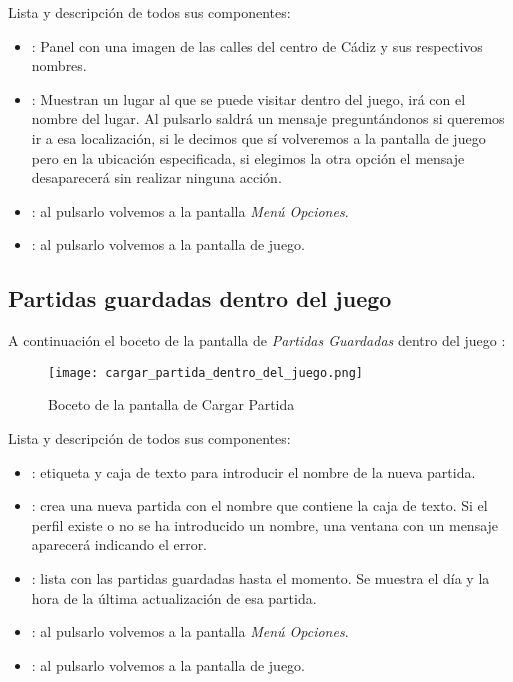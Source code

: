             Lista y descripción de todos sus componentes:
            \begin{itemize}
            \item {}: Panel con una imagen de las calles del centro de Cádiz y sus respectivos nombres.
            \item {}: Muestran un lugar al que se puede visitar dentro del juego, irá con el nombre del lugar. Al pulsarlo saldrá un mensaje preguntándonos si queremos ir a esa localización, si le decimos que sí volveremos a la pantalla de juego pero en la ubicación especificada, si elegimos la otra opción el mensaje desaparecerá sin realizar ninguna acción.
            \item {}: al pulsarlo volvemos a la pantalla \emph{Menú Opciones}.
            \item {}: al pulsarlo volvemos a la pantalla de juego.
            
            \end{itemize}
            
            \newpage
            \subsection{Partidas guardadas dentro del juego}
            A continuación el boceto de la pantalla de \emph{Partidas Guardadas} dentro del juego :
            
            \begin{figure}[H] 
                \begin{center}
                    \texttt{[image: cargar\_partida\_dentro\_del\_juego.png]}
                \end{center}
                \caption{Boceto de la pantalla de Cargar Partida}
                \label{fig:cargar-partida-dentro-juego}
            \end{figure}
            
            Lista y descripción de todos sus componentes:
            \begin{itemize}
            \item {}: etiqueta y caja de texto para introducir el nombre de la nueva partida.
            \item {}: crea una nueva partida con el nombre que contiene la caja de texto. Si el perfil existe o no se ha introducido un nombre, una ventana con un mensaje aparecerá indicando el error.
            \item {}: lista con las partidas guardadas hasta el momento. Se muestra el día y la hora de la última actualización de esa partida.
            \item {}: al pulsarlo volvemos a la pantalla \emph{Menú Opciones}.
            \item {}: al pulsarlo volvemos a la pantalla de juego.
            \end{itemize}
            
